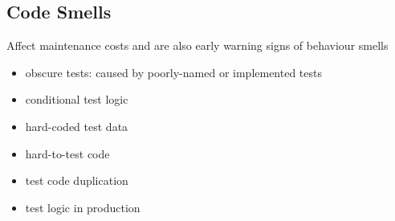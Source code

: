 \documentclass[]{article}
\theoremstyle{definition}
\begin{document}
	\subsection{Code Smells}
	Affect maintenance costs and are also early warning signs of behaviour smells

	\begin{itemize}
		\item obscure tests: caused by poorly-named or implemented tests
		\item conditional test logic
		\item hard-coded test data
		\item hard-to-test code
		\item test code duplication
		\item test logic in production
	\end{itemize}
\end{document}
